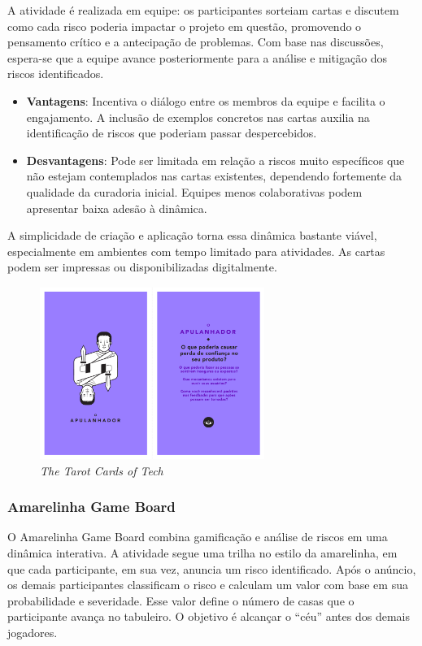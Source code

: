 \documentclass[
	12pt,
	openright,
	twoside,
	a4paper,
	english,
	brazil
	]{abntex2}
\begin{document}
A atividade é realizada em equipe: os participantes sorteiam cartas e discutem como cada risco poderia impactar o projeto em questão, promovendo o pensamento crítico e a antecipação de problemas. Com base nas discussões, espera-se que a equipe avance posteriormente para a análise e mitigação dos riscos identificados.

\begin{itemize}
\item \textbf{Vantagens}: Incentiva o diálogo entre os membros da equipe e facilita o engajamento. A inclusão de exemplos concretos nas cartas auxilia na identificação de riscos que poderiam passar despercebidos. 
\item \textbf{Desvantagens}: Pode ser limitada em relação a riscos muito específicos que não estejam contemplados nas cartas existentes, dependendo fortemente da qualidade da curadoria inicial. Equipes menos colaborativas podem apresentar baixa adesão à dinâmica.
\end{itemize}

A simplicidade de criação e aplicação torna essa dinâmica bastante viável, especialmente em ambientes com tempo limitado para atividades. As cartas podem ser impressas ou disponibilizadas digitalmente.

\begin{figure}[H]
  \centering
  \caption{\label{tarot-da-tecnologia} \textit{The Tarot Cards of Tech}}
  \includegraphics[width=0.65\textwidth]{tarot-da-tecnologia}
\end{figure}

\subsubsection{Amarelinha Game Board}

O Amarelinha Game Board combina gamificação e análise de riscos em uma dinâmica interativa. A atividade segue uma trilha no estilo da amarelinha, em que cada participante, em sua vez, anuncia um risco identificado. Após o anúncio, os demais participantes classificam o risco e calculam um valor com base em sua probabilidade e severidade. Esse valor define o número de casas que o participante avança no tabuleiro. O objetivo é alcançar o “céu” antes dos demais jogadores.
\end{document}
